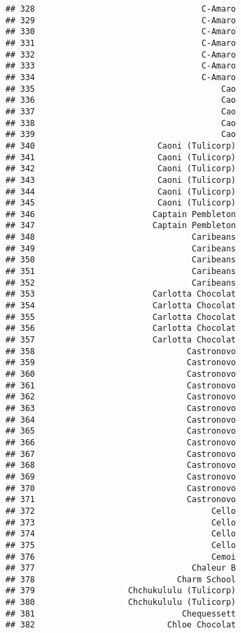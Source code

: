 \documentclass[
]{article}
\begin{document}
\begin{verbatim}
## 328                                  C-Amaro
## 329                                  C-Amaro
## 330                                  C-Amaro
## 331                                  C-Amaro
## 332                                  C-Amaro
## 333                                  C-Amaro
## 334                                  C-Amaro
## 335                                      Cao
## 336                                      Cao
## 337                                      Cao
## 338                                      Cao
## 339                                      Cao
## 340                         Caoni (Tulicorp)
## 341                         Caoni (Tulicorp)
## 342                         Caoni (Tulicorp)
## 343                         Caoni (Tulicorp)
## 344                         Caoni (Tulicorp)
## 345                         Caoni (Tulicorp)
## 346                        Captain Pembleton
## 347                        Captain Pembleton
## 348                                Caribeans
## 349                                Caribeans
## 350                                Caribeans
## 351                                Caribeans
## 352                                Caribeans
## 353                        Carlotta Chocolat
## 354                        Carlotta Chocolat
## 355                        Carlotta Chocolat
## 356                        Carlotta Chocolat
## 357                        Carlotta Chocolat
## 358                               Castronovo
## 359                               Castronovo
## 360                               Castronovo
## 361                               Castronovo
## 362                               Castronovo
## 363                               Castronovo
## 364                               Castronovo
## 365                               Castronovo
## 366                               Castronovo
## 367                               Castronovo
## 368                               Castronovo
## 369                               Castronovo
## 370                               Castronovo
## 371                               Castronovo
## 372                                    Cello
## 373                                    Cello
## 374                                    Cello
## 375                                    Cello
## 376                                    Cemoi
## 377                                Chaleur B
## 378                             Charm School
## 379                   Chchukululu (Tulicorp)
## 380                   Chchukululu (Tulicorp)
## 381                              Chequessett
## 382                           Chloe Chocolat

\end{verbatim}
\end{document}
